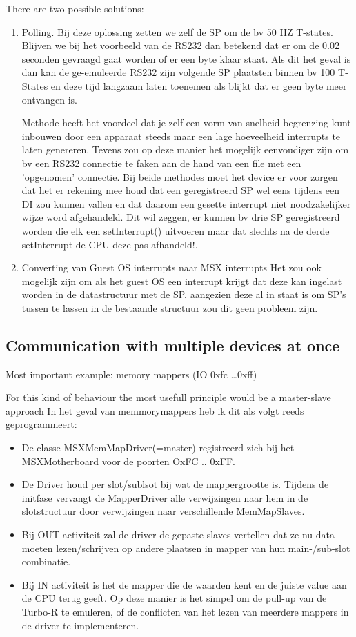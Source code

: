 \documentclass[11pt, a4paper]{report}
\begin{document}
There are two possible solutions:
\label{unpredic-irq}
\begin{enumerate}
\item Polling.
Bij deze oplossing zetten we zelf de SP om de bv 50 HZ T-states.
Blijven we bij het voorbeeld van de RS232 dan betekend dat er om de 0.02 seconden 
gevraagd gaat worden of er een byte klaar staat. Als dit het geval is dan kan de 
ge-emuleerde RS232 zijn volgende SP plaatsten binnen bv 100 T-States en deze tijd 
langzaam laten toenemen als blijkt dat er geen byte meer ontvangen is.

Methode heeft het voordeel dat je zelf een vorm van snelheid begrenzing kunt
inbouwen door een apparaat steeds maar een lage hoeveelheid interrupts te laten
genereren. Tevens zou op deze manier het mogelijk eenvoudiger zijn om bv een
RS232 connectie te faken aan de hand van een file met een 'opgenomen' connectie.
Bij beide methodes moet het device er voor zorgen dat het er rekening mee houd
dat een geregistreerd SP wel eens tijdens een DI zou kunnen vallen en dat daarom
een gesette interrupt niet noodzakelijker wijze word afgehandeld. Dit wil
zeggen, er kunnen bv drie SP geregistreerd worden die elk een setInterrupt()
uitvoeren maar dat slechts na de derde setInterrupt de CPU deze pas afhandeld!.

\item Converting van Guest OS interrupts naar MSX interrupts
Het zou ook mogelijk zijn om als het guest OS een interrupt krijgt dat deze kan 
ingelast worden in de datastructuur met de SP, aangezien deze al in staat is om 
SP's tussen te lassen in de bestaande structuur zou dit geen probleem zijn.
\end{enumerate}


\subsection{Communication with multiple devices at once}

Most important example: memory mappers (IO 0xfc \ldots 0xff)

For this kind of behaviour the most usefull principle would be a master-slave approach
In het geval van memmorymappers heb ik dit als volgt reeds geprogrammeert:
\begin{itemize}
\item De classe MSXMemMapDriver(=master) registreerd zich bij het MSXMotherboard voor de 
poorten OxFC .. 0xFF.
\item De Driver houd per slot/sublsot bij wat de mappergrootte is. Tijdens de initfase
vervangt de MapperDriver alle verwijzingen naar hem in de slotstructuur door verwijzingen 
naar verschillende MemMapSlaves.
\item Bij OUT activiteit zal de driver de gepaste slaves vertellen dat ze nu data moeten 
lezen/schrijven op andere plaatsen in mapper van hun main-/sub-slot combinatie.
\item Bij IN activiteit is het de mapper die de waarden kent en de juiste value aan de
CPU terug geeft. Op deze manier is het simpel om de pull-up van de Turbo-R te
emuleren, of de conflicten van het lezen van meerdere mappers in de driver te 
implementeren.
\end{itemize}
\end{document}
